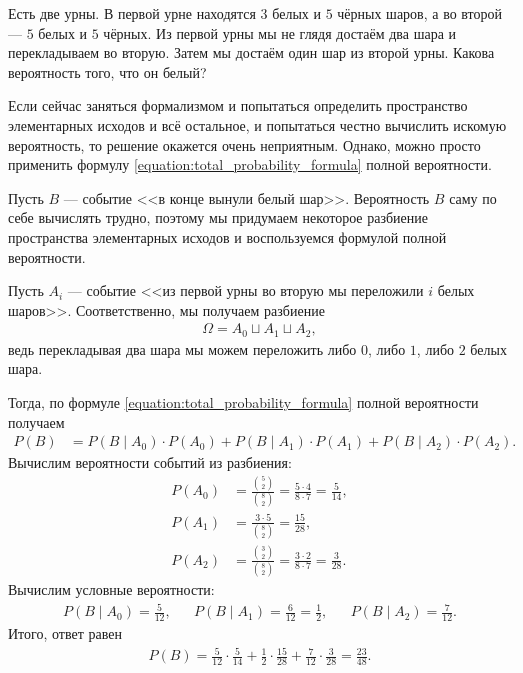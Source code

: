 \documentclass[../main.tex]{subfiles}
\begin{document}
\begin{exmpl*}
 Есть две урны. В первой урне находятся $3$ белых и $5$ чёрных шаров, а во второй --- $5$ белых и $5$ чёрных. Из первой урны мы не глядя достаём два шара и перекладываем во вторую. Затем мы достаём один шар из второй урны. Какова вероятность того, что он белый?

 Если сейчас заняться формализмом и попытаться определить пространство элементарных исходов и всё остальное, и попытаться честно вычислить искомую вероятность, то решение окажется очень неприятным. Однако, можно просто применить формулу \eqref{equation:total_probability_formula} полной вероятности.

 Пусть $B$ --- событие <<в конце вынули белый шар>>. Вероятность $ B $ саму по себе вычислять трудно, поэтому мы придумаем некоторое разбиение пространства элементарных исходов и воспользуемся формулой полной вероятности. 

 Пусть $A_i$ --- событие <<из первой урны во вторую мы переложили $i$ белых шаров>>. Соответственно, мы получаем разбиение
 \begin{align*}
  \Omega = A_0 \sqcup A_1 \sqcup A_2,
 \end{align*} ведь перекладывая два шара мы можем переложить либо $ 0 $, либо $ 1 $, либо $ 2 $ белых шара.

 Тогда, по формуле \eqref{equation:total_probability_formula} полной вероятности получаем
 \begin{align*}
  P(B) &= P(B \mid A_0) \cdot P(A_0) + P(B \mid A_1) \cdot P(A_1) + P(B \mid A_2) \cdot P(A_2).
 \end{align*} Вычислим вероятности событий из разбиения:
 \begin{align*}
  P(A_0) &= \frac{\binom 5 2}{\binom 8 2} = \frac{5 \cdot 4}{8 \cdot 7} = \frac{5}{14}, \\
  P(A_1) &= \frac{3 \cdot 5}{\binom 8 2} = \frac{15}{28}, \\
  P(A_2) &= \frac{\binom 3 2}{\binom 8 2} = \frac{3 \cdot 2}{8 \cdot 7} = \frac{3}{28}.
 \end{align*} Вычислим условные вероятности:
 \begin{align*}
  P(B \mid A_0) = \frac{5}{12}, & &P(B \mid A_1) = \frac{6}{12} = \frac{1}{2}, & &P(B \mid A_2) = \frac{7}{12}
 .\end{align*} Итого, ответ равен
 \begin{align*}
  P(B)  = \frac{5}{12} \cdot \frac{5}{14} + \frac{1}{2} \cdot \frac{15}{28} + \frac{7}{12} \cdot \frac{3}{28} = \frac{23}{48}.
 \end{align*} 

\end{exmpl*}
\end{document}
